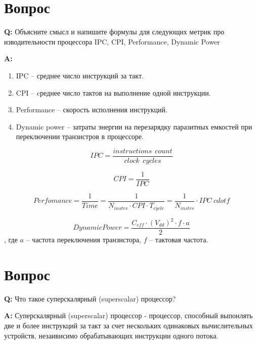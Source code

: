 \documentclass[12pt, letterpaper]{article}
\begin{document}



\section{Вопрос}

\textbf{Q: } Объясните смысл и напишите формулы для следующих метрик про
изводительности процессора IPC, CPI, Performance, Dynamic Power

\textbf{A: }

\begin{enumerate}
    \item IPC -- среднее число инструкций за такт.
    \item CPI -- cреднее число тактов на выполнение одной инструкции.
    \item Performance -- скорость исполнения инструкций.
    \item Dynamic power -- затраты энергии на перезарядку паразитных емкостей при переключении транзистров в процессоре.
\end{enumerate}

\begin{equation}
    IPC = \frac{instructions \:\: count}{clock \:\: cycles}
\end{equation}

\begin{equation}
    CPI = \frac{1}{IPC}
\end{equation}

\begin{equation}
    Perfomance = \frac{1}{Time} = \frac{1}{N_{instrs} \cdot CPI \cdot T_{cycle}} = \frac{1}{N_{instrs}} \cdot IPC \ cdot f
\end{equation}

\begin{equation}
    Dynamic Power = \frac{C_{eff} \cdot (V_{dd})^{2} \cdot f \cdot a}{2}
\end{equation}
, где $a$ -- частота переключения транзистора, $f$ -- тактовая частота.
\newpage

\section{Вопрос}

\textbf{Q: } Что такое суперскалярный (superscalar) процессор?

\textbf{A: } Суперскалярный (superscalar) процессор - процессор, способный выпонлять две и более инструкций за такт за счет нескольких одинаковых вычислительных устройств, незаивисимо обрабатывающих инструкции одного потока.
\end{document}
